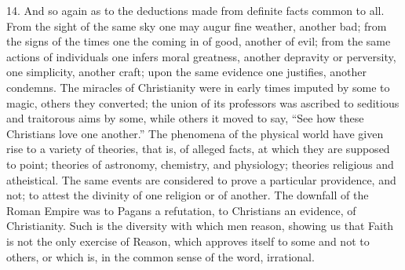 14. And so again as to the deductions made from definite facts
common to all. From the sight of the same sky one may augur fine
weather, another bad; from the signs of the times one the coming in of
good, another of evil; from the same actions of individuals one infers
moral greatness, another depravity or perversity, one simplicity,
another craft; upon the same evidence one justifies, another condemns.
The miracles of Christianity were in early times imputed by some to
magic, others they converted; the union of its professors was ascribed
to seditious and traitorous aims by some, while others it moved to
say, ``See how these Christians love one another.'' The
phenomena of the physical world have given rise to a variety of
theories, that is, of alleged facts, at which they are supposed to
point; theories of astronomy, chemistry, and physiology; theories
religious and atheistical. The same events are considered to prove a
particular providence, and not; to attest the divinity of one religion
or of another. The downfall of the Roman Empire was to Pagans a
refutation, to Christians an evidence, of Christianity. Such is the
diversity with which men reason, showing us that Faith is not the only
exercise of Reason, which approves itself to some and not to others,
or which is, in the common sense of the word, irrational.

